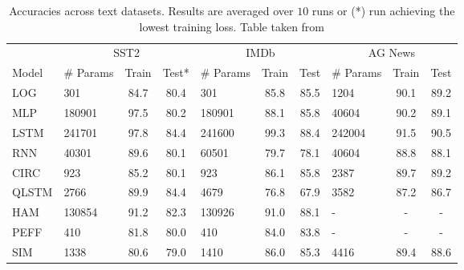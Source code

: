 \documentclass[../main.tex]{subfiles}
\begin{document}
\begin{table}
\begin{adjustwidth}{-1.5in}{-1.5in}  
\centering
\begin{tabular}{llcc|lcc|lcc}
\toprule
& \multicolumn{3}{c}{SST2} & \multicolumn{3}{c}{IMDb} & \multicolumn{3}{c}{AG News} \\
Model & \# Params & Train & Test* & \# Params & Train & Test & \# Params & Train & Test \\
\midrule
LOG     & 301       & 84.7 & 80.4   & 301     & 85.8 & 85.5 & 1204     & 90.1 & 89.2 \\
MLP     & 180901    & 97.5 & 80.2   & 180901    & 88.1 & 85.8 & 40604    & 90.2 & 89.1 \\
LSTM    & 241701    & 97.8 & 84.4   & 241600   & 99.3 & 88.4 & 242004   & 91.5 & 90.5 \\
RNN     & 40301     & 89.6 & 80.1   & 60501    & 79.7 & 78.1 & 40604    & 88.8 & 88.1 \\
CIRC    & 923       & 85.2 & 80.1    & 923     & 86.1 & 85.8 & 2387     & 89.7 & 89.2 \\
QLSTM  & 2766       & 89.9 & 84.4    & 4679     & 76.8 & 67.9 & 3582     & 87.2 & 86.7 \\
\hline
HAM     & 130854    & 91.2 & 82.3   & 130926    & 91.0    & 88.1 & -        & -    & - \\
PEFF    & 410       & 81.8 & 80.0    & 410  & 84.0    & 83.8 & -        & -    & - \\
SIM     & 1338      & 80.6 & 79.0    & 1410     & 86.0 & 85.3 & 4416     & 89.4 & 88.6 \\
\bottomrule
\end{tabular}
\end{adjustwidth}
\caption{Accuracies across text datasets. Results are averaged over $10$ runs or (*) run achieving the lowest training loss. Table taken from \cite{tiblias2025an}}
\label{tab:res-text}
\end{table}
\end{document}
